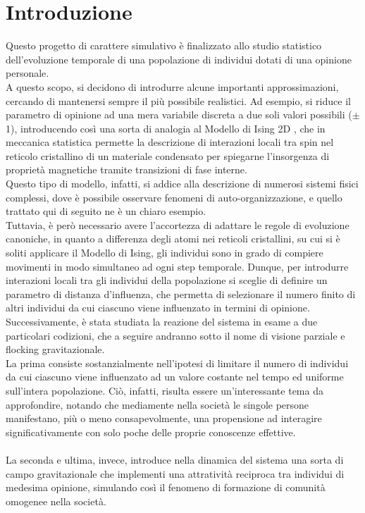 \documentclass[letterpaper,10pt]{article}
\begin{document}
\section{Introduzione}
\label{Sec:2}
Questo progetto di carattere simulativo è finalizzato allo studio statistico dell'evoluzione temporale di una popolazione di individui dotati di una opinione personale. 
\\ A questo scopo, si decidono di introdurre alcune importanti approssimazioni, cercando di mantenersi sempre il più possibile realistici. Ad esempio, si riduce il parametro di opinione ad una mera variabile discreta a due soli valori possibili ($\pm$1), introducendo così una sorta di analogia al Modello di Ising 2D \cite{ising}, che in meccanica statistica permette la descrizione di interazioni locali tra spin nel reticolo cristallino di un materiale condensato per spiegarne l'insorgenza di proprietà magnetiche tramite transizioni di fase interne.
\\ Questo tipo di modello, infatti, si addice alla descrizione di numerosi sistemi fisici complessi, dove è possibile osservare fenomeni di auto-organizzazione, e quello trattato qui di seguito ne è un chiaro esempio. 
\\ Tuttavia, è però necessario avere l'accortezza di adattare le regole di evoluzione canoniche, in quanto a differenza degli atomi nei reticoli cristallini, su cui si è soliti applicare il Modello di Ising, gli individui sono in grado di compiere movimenti in modo simultaneo ad ogni step temporale. Dunque, per introdurre interazioni locali tra gli individui della popolazione si sceglie di definire un parametro di distanza d'influenza, che permetta di selezionare il numero finito di altri individui da cui ciascuno viene influenzato in termini di opinione.
\\ Successivamente, è stata studiata la reazione del sistema in esame a due particolari codizioni, che a seguire andranno sotto il nome di visione parziale e flocking gravitazionale.
\\ La prima consiste sostanzialmente nell'ipotesi di limitare il numero di individui da cui ciascuno viene influenzato ad un valore costante nel tempo ed uniforme sull'intera popolazione. Ciò, infatti, risulta essere un'interessante tema da approfondire, notando che mediamente nella società le singole persone manifestano, più o meno consapevolmente, una propensione ad interagire significativamente con solo poche delle proprie conoscenze effettive.
\[\]
\\ La seconda e ultima, invece, introduce nella dinamica del sistema una sorta di campo gravitazionale che implementi una attratività reciproca tra individui di medesima opinione, simulando così il fenomeno di formazione di comunità omogenee nella società.
\end{document}
